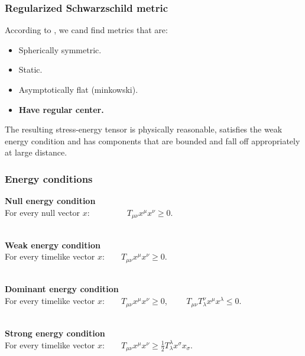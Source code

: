 \documentclass{beamer}
\begin{document}

\begin{frame}
\frametitle{Regularized Schwarzschild metric}
According to \cite{hayward}, we cand find metrics that are:

\begin{itemize}
\item Spherically symmetric.
\item Static.
\item Asymptotically flat (minkowski).
\item \textbf{Have regular center.}
\end{itemize}

The resulting stress-energy tensor is physically reasonable, satisfies the weak energy condition and has components that are bounded and fall off appropriately at large distance.


\end{frame}

\begin{frame}
\frametitle{Energy conditions}
\textbf{Null energy condition}\\
For every null vector $x$:\ \ \ \ \ \ \ \ \ $T_{\mu \nu}x^{\mu}x^{\nu} \geq 0$.\\\ 

\textbf{Weak energy condition}\\
For every timelike vector $x$:\ \ \ \ $T_{\mu \nu}x^{\mu}x^{\nu} \geq 0$.\\\

\textbf{Dominant energy condition}\\
For every timelike vector $x$:\ \ \ \ $T_{\mu \nu}x^{\mu}x^{\nu} \geq 0$, \ \ \ \ $T_{\mu \nu}T^{\nu}_{\lambda}x^{\mu}x^{\lambda} \leq 0$.\\\

\textbf{Strong energy condition}\\
For every timelike vector $x$:\ \ \ \ $T_{\mu \nu}x^{\mu}x^{\nu} \geq \frac{1}{2}T^{\lambda}_{\lambda}x^{\sigma}x_{\sigma}
$. 

\end{frame}




\end{document}
